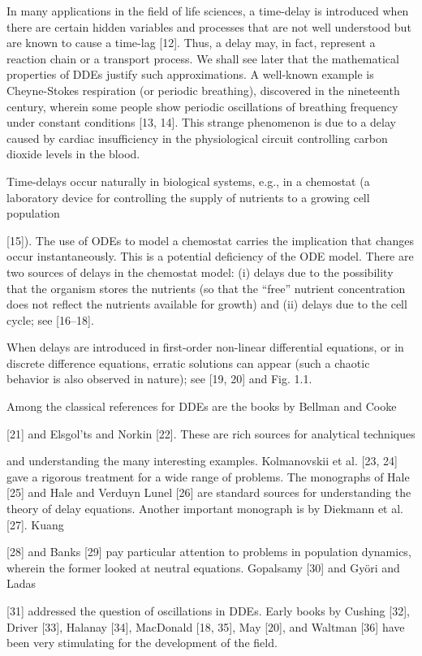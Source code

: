 \documentclass[12pt]{article}
\begin{document}
In many applications in the field of life sciences, a time-delay is introduced when there are certain hidden variables and processes that are 
not well understood but are known to cause a time-lag [12]. Thus, a delay may, in fact, represent a reaction chain or a transport process. We 
shall see later that the mathematical properties of DDEs justify such approximations. A well-known example is Cheyne-Stokes respiration (or 
periodic breathing), discovered in the nineteenth century, wherein some people show periodic oscillations of breathing frequency under 
constant conditions [13, 14]. This strange phenomenon is due to a delay caused by cardiac insufficiency in the physiological circuit 
controlling carbon dioxide levels in the blood.

Time-delays occur naturally in biological systems, e.g., in a chemostat (a laboratory device for controlling the supply of nutrients to a 
growing cell population

[15]). The use of ODEs to model a chemostat carries the implication that changes occur instantaneously. This is a potential deficiency of the 
ODE model. There are two sources of delays in the chemostat model: (i) delays due to the possibility that the organism stores the nutrients 
(so that the “free” nutrient concentration does not reﬂect the nutrients available for growth) and (ii) delays due to the cell cycle; see 
[16–18].

When delays are introduced in first-order non-linear differential equations, or in discrete difference equations, erratic solutions can 
appear (such a chaotic behavior is also observed in nature); see [19, 20] and Fig. 1.1.

Among the classical references for DDEs are the books by Bellman and Cooke

[21] and Elsgol’ts and Norkin [22]. These are rich sources for analytical techniques

and understanding the many interesting examples. Kolmanovskii et al. [23, 24] gave a rigorous treatment for a wide range of problems. The 
monographs of Hale [25] and Hale and Verduyn Lunel [26] are standard sources for understanding the theory of delay equations. Another 
important monograph is by Diekmann et al. [27]. Kuang

[28] and Banks [29] pay particular attention to problems in population dynamics, wherein the former looked at neutral equations. Gopalsamy 
[30] and Györi and Ladas

[31] addressed the question of oscillations in DDEs. Early books by Cushing [32], Driver [33], Halanay [34], MacDonald [18, 35], May [20], 
and Waltman [36] have been very stimulating for the development of the field.
\end{document}
